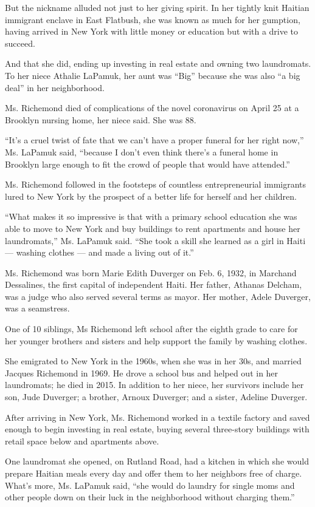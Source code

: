 But the nickname alluded not just to her giving spirit. In her tightly
knit Haitian immigrant enclave in East Flatbush, she was known as much
for her gumption, having arrived in New York with little money or
education but with a drive to succeed.

And that she did, ending up investing in real estate and owning two
laundromats. To her niece Athalie LaPamuk, her aunt was ``Big'' because
she was also ``a big deal'' in her neighborhood.

Ms. Richemond died of complications of the novel coronavirus on April 25
at a Brooklyn nursing home, her niece said. She was 88.

``It's a cruel twist of fate that we can't have a proper funeral for her
right now,'' Ms. LaPamuk said, ``because I don't even think there's a
funeral home in Brooklyn large enough to fit the crowd of people that
would have attended.''

Ms. Richemond followed in the footsteps of countless entrepreneurial
immigrants lured to New York by the prospect of a better life for
herself and her children.

``What makes it so impressive is that with a primary school education
she was able to move to New York and buy buildings to rent apartments
and house her laundromats,'' Ms. LaPamuk said. ``She took a skill she
learned as a girl in Haiti --- washing clothes --- and made a living out
of it.''

Ms. Richemond was born Marie Edith Duverger on Feb. 6, 1932, in Marchand
Dessalines, the first capital of independent Haiti. Her father, Athanas
Delcham, was a judge who also served several terms as mayor. Her mother,
Adele Duverger, was a seamstress.

One of 10 siblings, Ms Richemond left school after the eighth grade to
care for her younger brothers and sisters and help support the family by
washing clothes.

She emigrated to New York in the 1960s, when she was in her 30s, and
married Jacques Richemond in 1969. He drove a school bus and helped out
in her laundromats; he died in 2015. In addition to her niece, her
survivors include her son, Jude Duverger; a brother, Arnoux Duverger;
and a sister, Adeline Duverger.

After arriving in New York, Ms. Richemond worked in a textile factory
and saved enough to begin investing in real estate, buying several
three-story buildings with retail space below and apartments above.

One laundromat she opened, on Rutland Road, had a kitchen in which she
would prepare Haitian meals every day and offer them to her neighbors
free of charge. What's more, Ms. LaPamuk said, ``she would do laundry
for single moms and other people down on their luck in the neighborhood
without charging them.''

